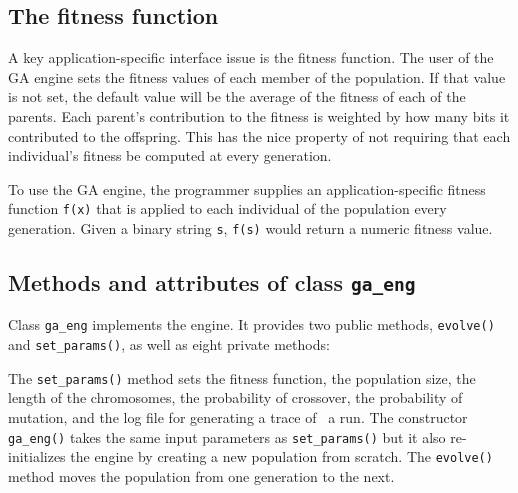 \subsection*{The fitness function}

A key application-specific interface issue is the fitness function. The
user of the GA engine sets the fitness values of each member of the
population. If that value is not set, the default value will be the
average of the fitness of each of the parents. Each
parent's contribution to the fitness is weighted by
how many bits it contributed to the offspring. This has the nice
property of not requiring that each individual's
fitness be computed at every generation.

To use the GA engine, the programmer supplies an application-specific
fitness function \texttt{f(x)} that is applied to each individual of
the population every generation. Given a binary string \texttt{s},
\texttt{f(s)} would return a numeric fitness value.

\subsection*{Methods and attributes of class \texttt{ga\_eng}}

Class \texttt{ga\_eng} implements the engine. It provides
two public methods, \texttt{evolve()} and \texttt{set\_params()}, as
well as eight private methods:


The \texttt{set\_params()} method sets the fitness function, the
population size, the length of the chromosomes, the probability of
crossover, the probability of mutation, and the log file for generating
a trace of \ a run. The constructor
\texttt{ga\_eng()} takes the same input parameters as
\texttt{set\_params()} but it also re-initializes the engine by
creating a new population from scratch. The \texttt{evolve()} method
moves the population from one generation to the next.

